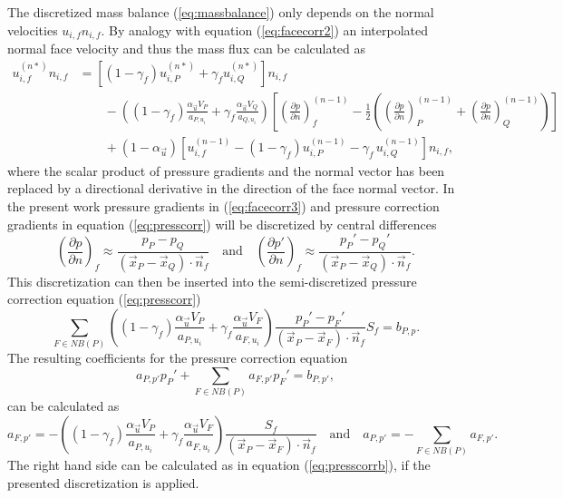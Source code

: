   The discretized mass balance (\ref{eq:massbalance}) only depends on the normal velocities \(u_{i,f} n_{i,f}\). By analogy with equation (\ref{eq:facecorr2}) an interpolated normal face velocity and thus the mass flux can be calculated as
  \begin{align}
    \label{eq:facecorr3}
    u_{i,f}^{(n*)} n_{i,f}
    &=
    \left[\left(1 - \gamma_f\right) u_{i,P}^{(n*)} + \gamma_f u_{i,Q}^{(n*)} \right]n_{i,f} \nonumber\\[1em]
    &\quad\quad - 
    \left(\left(1 - \gamma_f\right) \frac{\alpha_\vec{u} V_P}{a_{P,u_i}} + \gamma_f \frac{\alpha_\vec{u} V_Q}{a_{Q,u_i}}\right)
    \left[ 
    \left(\frac{\partial p}{\partial n}\right)_f^{(n-1)} 
    -  \frac{1}{2} \left( \left( \frac{\partial p}{\partial n} \right)_P^{(n-1)} 
    +  \left(\frac{\partial p}{\partial n}\right)_Q^{(n-1)} \right)
  \right] \nonumber \\[1em]
  &\quad\quad + \left(1 - \alpha_\vec{u}\right) \left[ u_{i,f}^{(n-1)} - \left(1 - \gamma_f\right) u_{i,P}^{(n-1)} - \gamma_f \, u_{i,Q}^{(n-1)} \right] n_{i,f},
  \end{align}
  where the scalar product of pressure gradients and the normal vector has been replaced by a directional derivative in the direction of the face normal vector. In the present work pressure gradients in (\ref{eq:facecorr3}) and pressure correction gradients in equation (\ref{eq:presscorr}) will be discretized by central differences
  \begin{displaymath}
  \left(\frac{\partial p}{\partial n}\right)_f \approx \frac{p_P - p_Q}{\left(\vec{x}_P - \vec{x}_Q\right)\cdot \vec{n}_f} 
  \quad \text{and} \quad 
  \left(\frac{\partial p'}{\partial n}\right)_f \approx \frac{p_P' - p_Q'}{\left(\vec{x}_P - \vec{x}_Q\right)\cdot \vec{n}_f}.
  \end{displaymath}
  This discretization can then be inserted into the semi-discretized pressure correction equation (\ref{eq:presscorr}) 
  \begin{equation}
    \sum_{F \in NB(P)} \left(\left(1 - \gamma_f\right) \frac{\alpha_\vec{u} V_P}{a_{P,u_i}} + \gamma_f \frac{\alpha_\vec{u} V_F}{a_{F,u_i}}\right)
     \frac{p_P' - p_F'}{\left(\vec{x}_P - \vec{x}_F\right)\cdot \vec{n}_f} S_f
    = b_{P,p}.
  \end{equation}
  The resulting coefficients for the pressure correction equation
  \begin{displaymath}
    a_{P,p'} p_{P}' + \sum_{F \in NB(P)} a_{F,p'} p_{F}' = b_{P,p'},
  \end{displaymath}
  can be calculated as
  \begin{equation}
    \label{eq:segpresscorrcoeff}
    a_{F,p'} = -\left(\left(1 - \gamma_f\right) \frac{\alpha_\vec{u} V_P}{a_{P,u_i}} + \gamma_f \frac{\alpha_\vec{u} V_F}{a_{F,u_i}}\right) \frac{S_f}{\left(\vec{x}_P - \vec{x}_F\right) \cdot \vec{n}_f} \quad \text{and} \quad
    a_{P,p'} = - \sum_{F \in NB(P)} a_{F,p'}.
  \end{equation}
  The right hand side can be calculated as in equation (\ref{eq:presscorrb}), if the presented discretization is applied. 


